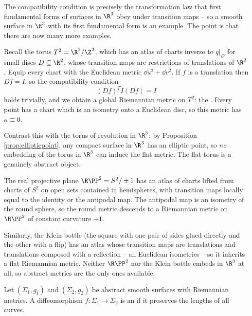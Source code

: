 The compatibility condition is precisely the transformation law that first fundamental forms of surfaces in $\R^3$ obey under transition maps -- so a smooth surface in $\R^3$ with its first fundamental form is an example. The point is that there are now many more examples.

\begin{example}\label{ex:flattorus}
    Recall the torus $T^2 = \R^2/\Z^2$, which has an atlas of charts inverse to $q|_{D}$ for small discs $D \subseteq \R^2$, whose transition maps are restrictions of translations of $\R^2$. Equip every chart with the Euclidean metric $\dd u^2 + \dd v^2$. If $f$ is a translation then $Df = I$, so the compatibility condition
    $$
    (Df)^T I (Df) = I
    $$
    holds trivially, and we obtain a global Riemannian metric on $T^2$: the . Every point has a chart which is an isometry onto a Euclidean disc, so this metric has $\kappa \equiv 0$.

    Contrast this with the torus of revolution in $\R^3$: by Proposition \ref{prop:ellipticpoint}, any compact surface in $\R^3$ has an elliptic point, so \emph{no} embedding of the torus in $\R^3$ can induce the flat metric. The flat torus is a genuinely abstract object.
\end{example}

\begin{example}
    The real projective plane $\R\PP^2 = S^2/\pm 1$ has an atlas of charts lifted from charts of $S^2$ on open sets contained in hemispheres, with transition maps locally equal to the identity or the antipodal map. The antipodal map is an isometry of the round sphere, so the round metric descends to a Riemannian metric on $\R\PP^2$ of constant curvature $+1$.

    Similarly, the Klein bottle (the square with one pair of sides glued directly and the other with a flip) has an atlas whose transition maps are translations and translations composed with a reflection -- all Euclidean isometries -- so it inherits a flat Riemannian metric. Neither $\R\PP^2$ nor the Klein bottle embeds in $\R^3$ at all, so abstract metrics are the only ones available.
\end{example}

\begin{definition}
    Let $(\Sigma_1, g_1)$ and $(\Sigma_2, g_2)$ be abstract smooth surfaces with Riemannian metrics. A diffeomorphism $f: \Sigma_1 \rightarrow \Sigma_2$ is an  if it preserves the lengths of all curves.
\end{definition}

